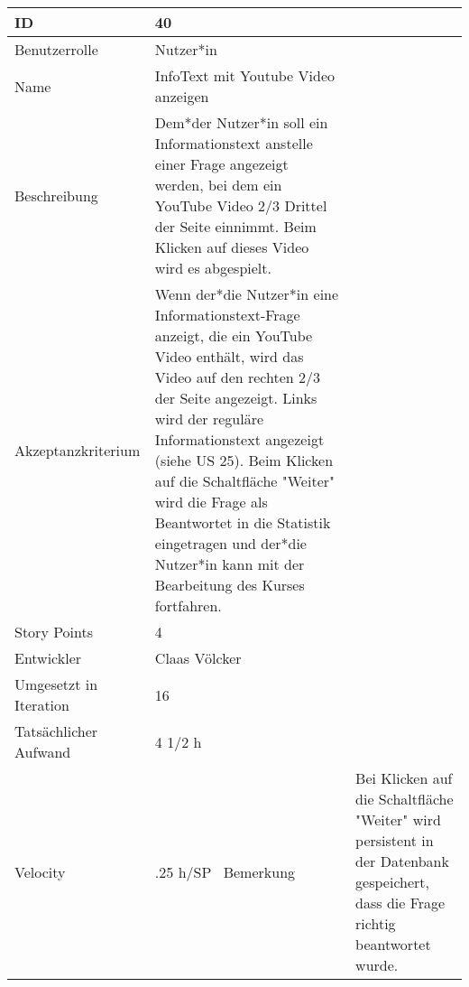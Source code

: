 \begin{tabularx}{\textwidth}{|p{}|X|}
	\hline
	ID & 40\\
	\hline
	Benutzerrolle & Nutzer*in\\
	\hline
	Name & InfoText mit Youtube Video anzeigen\\
	\hline
	Beschreibung & Dem*der Nutzer*in soll ein Informationstext anstelle einer Frage angezeigt werden, bei dem ein YouTube Video 2/3 Drittel der Seite einnimmt. Beim Klicken auf dieses Video wird es abgespielt.\\
	\hline
	Akzeptanzkriterium & Wenn der*die Nutzer*in eine Informationstext-Frage anzeigt, die ein YouTube Video enthält, wird das Video auf den rechten 2/3 der Seite angezeigt. Links wird der reguläre Informationstext angezeigt (siehe US 25). Beim Klicken auf die Schaltfläche "Weiter" wird die Frage als Beantwortet in die Statistik eingetragen und der*die Nutzer*in kann mit der Bearbeitung des Kurses fortfahren.\\
	\hline
	Story Points & 4\\
	\hline
	Entwickler & Claas Völcker\\
	\hline
	Umgesetzt in Iteration & 16\\
	\hline
	Tatsächlicher Aufwand & 4 1/2 h\\
	\hline
	Velocity & \1.25 h/SP\
	\hline
	Bemerkung & Bei Klicken auf die Schaltfläche "Weiter" wird persistent in der Datenbank gespeichert, dass die Frage richtig beantwortet wurde.\\
	\hline
\end{tabularx}
\vspace{20pt}
